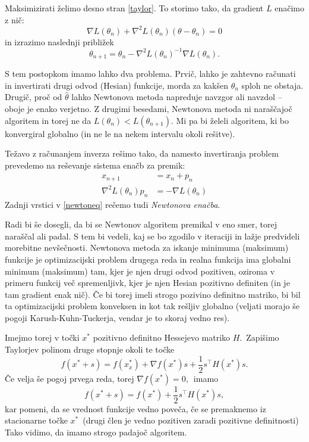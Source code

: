 \documentclass[12pt,a4paper]{amsart}
\theoremstyle{definition} %
\theoremstyle{plain} %
\begin{document}
Maksimizirati želimo desno stran \eqref{taylor}. To storimo tako, da gradient $L$ enačimo z nič:
\[
    \nabla L(\theta_{n}) + \nabla^2L(\theta_{n})(\theta - \theta_{n}) = 0  
\]
in izrazimo naslednji približek
\[
    \theta_{n + 1} = \theta_{n} - \nabla^{2}L(\theta_{n})^{-1}\nabla L(\theta_{n}).
\]

S tem postopkom imamo lahko dva problema. Prvič, lahko je zahtevno računati in invertirati drugi odvod (Hesian) funkcije, morda za kakšen $\theta_{n}$ sploh ne obstaja.
Drugič, proč od $\hat{\theta}$ lahko Newtonova metoda napreduje navzgor ali navzdol -- oboje je enako verjetno. Z drugimi besedami, Newtonova metoda ni naraščajoč algoritem in torej
ne da $L(\theta_{n}) < L(\theta_{n+1}).$ Mi pa bi želeli algoritem, ki bo konvergiral globalno (in ne le na nekem intervalu okoli rešitve).

Težavo z računanjem inverza rešimo tako, da namesto invertiranja problem prevedemo na reševanje sistema enačb za premik:
\begin{align}\label{newtoneq}
    x_{n + 1} &= x_{n} + p_{n} \nonumber\\
    \nabla^2L(\theta_{n})p_{n} &= -\nabla L(\theta_{n})
\end{align}
Zadnji vrstici v \eqref{newtoneq} rečemo tudi \textit{Newtonova enačba}.

Radi bi še dosegli, da bi se Newtonov algoritem premikal v eno smer, torej naraščal ali padal. S tem bi vedeli, kaj se bo zgodilo v iteraciji in lažje predvideli morebitne
nevšečnosti. Newtonova metoda za iskanje minimuma (maksimum) funkcije je optimizacijski problem drugega reda in realna funkcija ima globalni minimum (maksimum) tam, kjer je
njen drugi odvod pozitiven, oziroma v primeru funkcij več spremenljivk, kjer je njen Hesian pozitivno definiten (in je tam gradient enak nič). Če bi torej imeli
strogo pozivino definitno matriko, bi bil ta optimizacijski problem konveksen in kot tak rešljiv globalno (veljati morajo še pogoji Karush-Kuhn-Tuckerja, vendar je to skoraj vedno res).

Imejmo torej v točki $x^{*}$ pozitivno definitno Hessejevo matriko $H.$~Zapišimo Taylorjev polinom druge stopnje okoli te točke
\[
    f(x^{*} + s) = f(x_x^{*}) + \nabla f(x^{*})s + \frac{1}{2}s^\top H(x^{*})s.
\]
Če velja še pogoj prvega reda, torej $\nabla f(x^{*}) = 0,$~imamo
\[
    f(x^{*} + s) = f(x^{*}) + \frac{1}{2}s^\top H(x^{*})s,
\]
kar pomeni, da se vrednost funkcije vedno poveča, če se premaknemo iz stacionarne točke $x^{*}$~(drugi člen je vedno pozitiven zaradi pozitivne definitnosti)
Tako vidimo, da imamo strogo padajoč algoritem.
\end{document}
